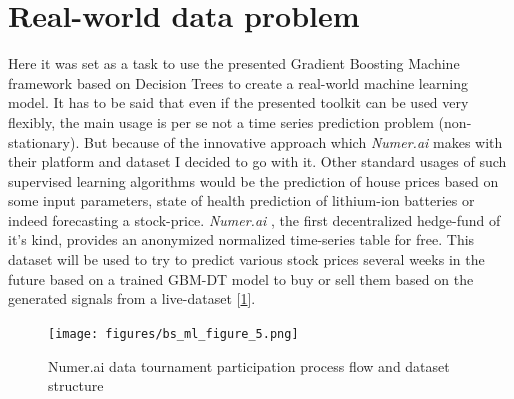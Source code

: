 \documentclass[12pt, a4paper]{article}
\begin{document}
\section{Real-world data problem}
Here it was set as a task to use the presented Gradient Boosting Machine framework based on Decision Trees to create a real-world machine learning model. It has to be said that even if the presented toolkit can be used very flexibly, the main usage is per se not a time series prediction problem (non-stationary). But because of the innovative approach which \textit{Numer.ai} makes with their platform and dataset I decided to go with it.
Other standard usages of such supervised learning algorithms would be the prediction of house prices based on some input parameters, state of health prediction of lithium-ion batteries or indeed forecasting a stock-price. \textit{Numer.ai} \cite{Numerai}, the first decentralized hedge-fund of it's kind, provides an anonymized normalized time-series table for free. This dataset will be used to try to predict various stock prices several weeks in the future based on a trained GBM-DT model to buy or sell them based on the generated signals from a live-dataset [\ref{fig: numerai_workflow}].
\begin{figure}[!htpb]
    \centering
    \texttt{[image: figures/bs\_ml\_figure\_5.png]}
    \caption[Numer.ai data tournament participation process flow and dataset structure]{Numer.ai data tournament participation process flow and dataset structure \cite{Numerai}}
    \label{fig: numerai_workflow}
\end{figure}
\end{document}
